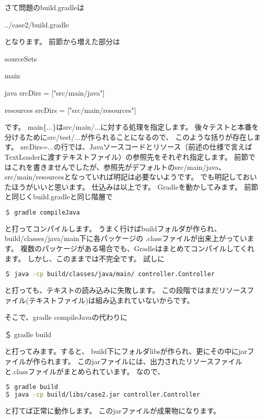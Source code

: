 \documentclass[a4paper,12pt]{article}
\begin{document}
\newpage
さて問題のbuild.gradleは
\begin{lstinputlisting}[caption=build.gradle]
	{../case2/build.gradle}
\end{lstinputlisting}
となります。
前節から増えた部分は
\begin{java}
sourceSets {
	main {
		java {
			srcDirs = ["src/main/java"]
		}
		
		resources {
			srcDirs = ["src/main/resources"]
		}
	}
}
\end{java}
です。
main\{$\ldots$\}はsrc/main/$\ldots$に対する処理を指定します。
後々テストと本番を分けるためにsrc/test/$\ldots$が作られることになるので、
このような括りが存在します。
srcDirs=$\ldots$の行では、Javaソースコードとリソース（前述の仕様で言えばTextLoaderに渡すテキストファイル）の参照先をそれぞれ指定します。
前節ではこれを書きませんでしたが、参照先がデフォルトのsrc/main/java、src/main/resourcesとなっていれば明記は必要ないようです。
でも明記しておいたほうがいいと思います。
\newpage
仕込みは以上です。
Gradleを動かしてみます。
前節と同じくbuild.gradleと同じ階層で
\begin{lstlisting}[language=bash]
＄ gradle compileJava
\end{lstlisting}
と打ってコンパイルします。
うまく行けばbuildフォルダが作られ、build/classes/java/main下に各パッケージの
.classファイルが出来上がっています。
複数のパッケージがある場合でも、Gradleはまとめてコンパイルしてくれます。
しかし、このままでは不完全です。
試しに
\begin{lstlisting}[language=bash]
＄ java -cp build/classes/java/main/ controller.Controller
\end{lstlisting}
と打っても、テキストの読み込みに失敗します。
この段階ではまだリソースファイル(テキストファイル)は組み込まれていないからです。

そこで、gradle compileJavaの代わりに
\begin{shell}
＄ gradle build
\end{shell}
と打ってみます。すると、%
build下にフォルダlibsが作られ、更にその中にjarファイルが作られます。
このjarファイルには、出力されたリソースファイルと.classファイルがまとめられています。
なので、
\begin{lstlisting}[language=bash]
＄ gradle build
＄ java -cp build/libs/case2.jar controller.Controller
\end{lstlisting}
と打てば正常に動作します。
このjarファイルが成果物になります。
\end{document}
